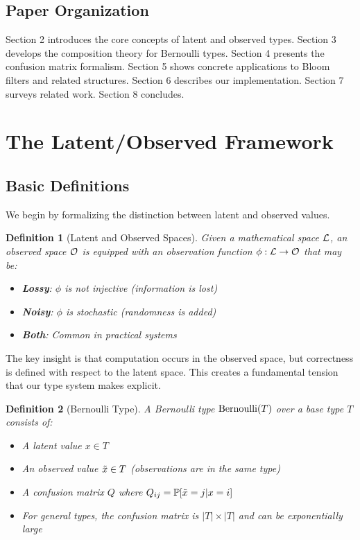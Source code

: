 \documentclass[11pt]{article}
\newtheorem{definition}{Definition}
\begin{document}
\subsection{Paper Organization}

Section 2 introduces the core concepts of latent and observed types. Section 3 develops the composition theory for Bernoulli types. Section 4 presents the confusion matrix formalism. Section 5 shows concrete applications to Bloom filters and related structures. Section 6 describes our implementation. Section 7 surveys related work. Section 8 concludes.

\section{The Latent/Observed Framework}

\subsection{Basic Definitions}

We begin by formalizing the distinction between latent and observed values.

\begin{definition}[Latent and Observed Spaces]
Given a mathematical space $\mathcal{L}$, an observed space $\mathcal{O}$ is equipped with an observation function $\phi: \mathcal{L} \to \mathcal{O}$ that may be:
\begin{itemize}
\item \textbf{Lossy}: $\phi$ is not injective (information is lost)
\item \textbf{Noisy}: $\phi$ is stochastic (randomness is added)
\item \textbf{Both}: Common in practical systems
\end{itemize}
\end{definition}

The key insight is that computation occurs in the observed space, but correctness is defined with respect to the latent space. This creates a fundamental tension that our type system makes explicit.

\begin{definition}[Bernoulli Type]
A Bernoulli type $\text{Bernoulli}(T)$ over a base type $T$ consists of:
\begin{itemize}
\item A latent value $x \in T$
\item An observed value $\tilde{x} \in T$ (observations are in the same type)
\item A confusion matrix $Q$ where $Q_{ij} = \mathbb{P}[\tilde{x} = j | x = i]$
\item For general types, the confusion matrix is $|T| \times |T|$ and can be exponentially large
\end{itemize}
\end{definition}
\end{document}
